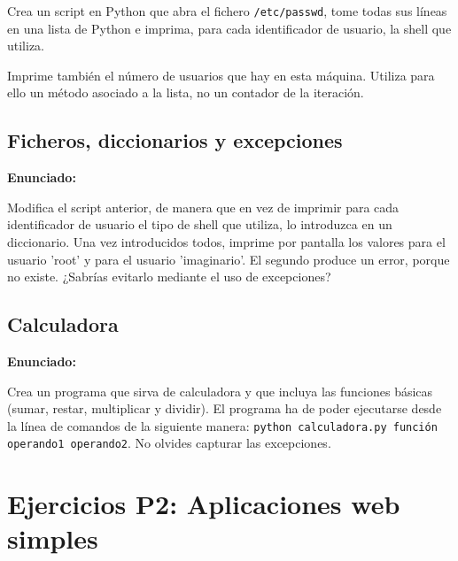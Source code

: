 Crea un script en Python que abra el fichero \verb|/etc/passwd|, tome todas sus líneas en una lista de Python e imprima, para cada identificador de usuario, la shell que utiliza.

Imprime también el número de usuarios que hay en esta máquina. Utiliza para
ello un método asociado a la lista, no un contador de la iteración.

\subsection{Ficheros, diccionarios y excepciones}
\label{subsec:ficheros-dic-excep}

\textbf{Enunciado:}

Modifica el script
anterior, de manera que en vez de imprimir para cada identificador de usuario el tipo
de shell que utiliza, lo introduzca en un diccionario. Una vez introducidos todos, imprime por pantalla los valores para el usuario 'root' y para el
usuario 'imaginario'. El segundo produce un error, porque no existe. ¿Sabrías evitarlo mediante el uso de
excepciones?


\subsection{Calculadora}
\label{subsec:calculadora}

\textbf{Enunciado:}

Crea un programa que sirva de calculadora y que incluya las funciones
básicas (sumar, restar, multiplicar y dividir). El programa ha de poder ejecutarse desde la línea de comandos de la siguiente manera: \texttt{python calculadora.py
función operando1 operando2}. No olvides capturar las excepciones.

\newpage

\section{Ejercicios P2: Aplicaciones web simples}

